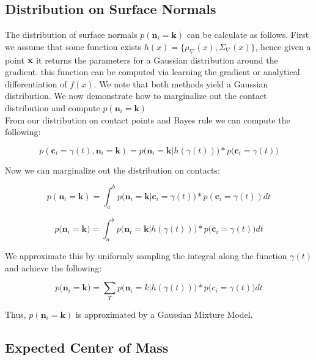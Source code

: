 \documentclass[letterpaper, 10 pt, conference]{ieeeconf}  %
\begin{document}
\subsection{Distribution on Surface Normals} 
The distribution of surface normals $p(\textbf{n}_i = \textbf{k})$ can be calculate as follows.
First we assume that some function exists $h(x) = \lbrace \mu_{\nabla}(x), \Sigma_{\nabla}(x) \rbrace$, hence given a point $\bf{x}$ it returns the parameters for a Gaussian distribution around the gradient.
this function can be computed via learning the gradient \cite{solak2003derivative} or analytical differentiation of $f(x)$.
We note that both methods yield a Gaussian distribution.
We now demonstrate how to marginalize out the contact distribution and compute $p(\textbf{n}_i = \textbf{k})$\\

From our distribution on contact points and Bayes rule we can compute the following: 

\begin{equation}
p(\textbf{c}_i = \gamma(t), \textbf{n}_i = \textbf{k}) = p\big(\textbf{n}_i = \textbf{k} | h(\gamma(t))\big)*p\big(\textbf{c}_i = \gamma(t)\big)
\end{equation}

Now we can marginalize out the distribution on contacts:

\begin{equation}
p(\textbf{n}_i = \textbf{k}) = \int_a^b  p \big(\textbf{n}_i = \textbf{k} | \textbf{c}_i = \gamma(t) \big)*p(\textbf{c}_i = \gamma(t)) dt
\end{equation}

\begin{equation}
p\big(\textbf{n}_i = \textbf{k}\big) = \int_a^b  p \big(\textbf{n}_i = \textbf{k} | h(\gamma(t))\big)*p\big(\textbf{c}_i = \gamma(t)\big) dt
\end{equation}

We approximate this by uniformly sampling the integral along the function $\gamma(t)$ and achieve the following: 

\begin{equation}
p\big( \textbf{n}_i = \textbf{k} \big) = \sum_T  p \big( \textbf{n}_i = k | h(\gamma(t)) \big) *p\big(c_i = \gamma(t)\big) dt
\end{equation}


Thus, $p(\textbf{n}_i = \textbf{k})$ is approximated by a Gaussian Mixture Model.

\subsection{Expected Center of Mass} 
\end{document}
